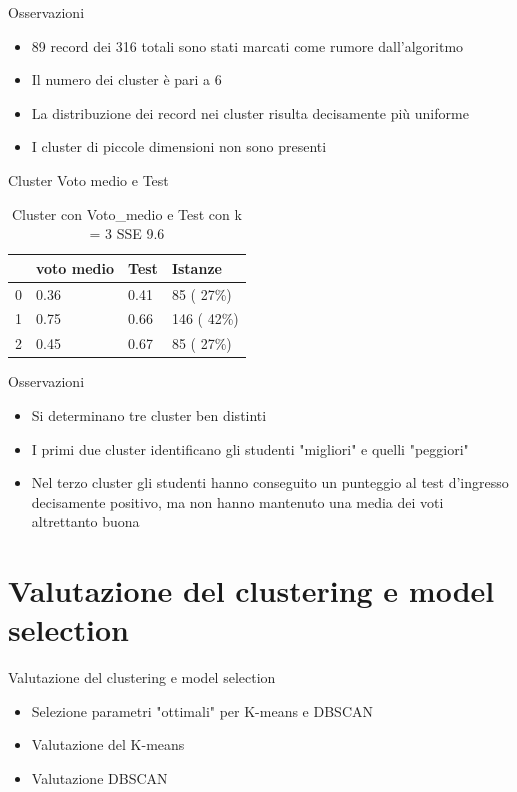 \documentclass{beamer}
\begin{document}
\begin{frame}{Osservazioni}
  \begin{itemize}
    \item 89 record dei 316 totali sono stati marcati come rumore dall’algoritmo
    \item Il numero dei cluster è pari a 6
    \item La distribuzione dei record nei cluster risulta decisamente più uniforme
    \item I cluster di piccole dimensioni non sono presenti
  \end{itemize}
\end{frame}

\begin{frame}{Cluster Voto medio e Test}
  \begin{table}[ht]
    \centering
    \begin{tabular}{@{}llll@{}}
    \toprule
      & voto medio & Test  & Istanze\\ \midrule
    0 & 0.36       & 0.41  & 85  ( 27\%)\\
    1 & 0.75       & 0.66  & 146 ( 42\%)\\
    2 & 0.45       & 0.67  & 85  ( 27\%)\\ \bottomrule
    \end{tabular}
    \caption{Cluster con Voto\_medio e Test con k = 3 SSE 9.6}
    \label{c3MT}
  \end{table}
\end{frame}

\begin{frame}{Osservazioni}
  \begin{itemize}
    \item Si determinano tre cluster ben distinti
    \item I primi due cluster identificano gli studenti "migliori" e quelli "peggiori"
    \item Nel terzo cluster gli studenti hanno conseguito un punteggio al test d’ingresso decisamente positivo, ma non hanno mantenuto una media dei voti altrettanto buona
  \end{itemize}
\end{frame}

\section{Valutazione del clustering e model selection}

\begin{frame}{Valutazione del clustering e model selection} 
    \begin{itemize}
      \item Selezione parametri "ottimali" per K-means e DBSCAN
      \item Valutazione del K-means
      \item Valutazione DBSCAN
    \end{itemize} 
\end{frame}
\end{document}
